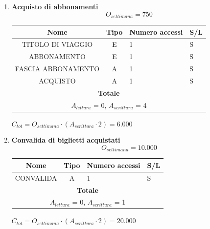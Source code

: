 \documentclass[12pt,a4paper]{report}
\begin{document}
\begin{enumerate}[label=\textbf{\arabic*)}]
    \item \textbf{Acquisto di abbonamenti} \\
    \[ {O_{settimana} = 750} \]
    \begin{table}[H]
    \centering
    \begin{tabular}{|c|c|l|l|}
    \hline
    \textbf{Nome} & \textbf{Tipo} & \textbf{Numero accessi} & \textbf{S/L} \\
    \hline
    TITOLO DI VIAGGIO & E & 1 & S \\
    \hline
    ABBONAMENTO & E & 1 & S \\
    \hline
    FASCIA ABBONAMENTO & A & 1 & S \\
    \hline
    ACQUISTO & A & 1 & S \\
    \hline
    \multicolumn{4}{c}{\textbf{Totale}} \\    
    \multicolumn{4}{c}{${A_{lettura}}$ = 0, ${A_{scrittura}}$ = 4} \\
    \hline
    \end{tabular}
    \end{table}
    \begin{center}
    ${C_{tot} = {O_{settimana}}\cdot({A_{scrittura}}\cdot 2) = 6.000}$
    \end{center}

    \item \textbf{Convalida di biglietti acquistati} \\
    \[ {O_{settimana} = 10.000} \]
    \begin{table}[H]
    \centering
    \begin{tabular}{|c|c|l|l|}
    \hline
    \textbf{Nome} & \textbf{Tipo} & \textbf{Numero accessi} & \textbf{S/L} \\
    \hline
    CONVALIDA & A & 1 & S \\
    \hline
    \multicolumn{4}{c}{\textbf{Totale}} \\    
    \multicolumn{4}{c}{${A_{lettura}}$ = 0, ${A_{scrittura}}$ = 1} \\
    \hline
    \end{tabular}
    \end{table}
    \begin{center}
    ${C_{tot} = {O_{settimana}}\cdot({A_{scrittura}}\cdot 2) = 20.000}$
    \end{center}


\end{enumerate}
\end{document}

